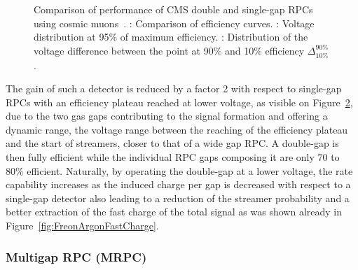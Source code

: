 \begin{figure}[H]
\begin{subfigure}{0.5\linewidth}
			\caption{\label{fig:DoubleGap:C}}
		\end{subfigure}
		\caption{\label{fig:DoubleGap} Comparison of performance of CMS double and single-gap RPCs using cosmic muons~\cite{ABBRESCIA2005}. : Comparison of efficiency curves. : Voltage distribution at 95\% of maximum efficiency. : Distribution of the voltage difference between the point at 90\% and 10\% efficiency $\Delta^{90\%}_{10\%}$.}
	\end{figure}
	
	The gain of such a detector is reduced by a factor 2 with respect to single-gap RPCs with an efficiency plateau reached at lower voltage, as visible on Figure~\ref{fig:DoubleGap}, due to the two gas gaps contributing to the signal formation and offering a dynamic range, the voltage range between the reaching of the efficiency plateau and the start of streamers, closer to that of a wide gap RPC. A double-gap is then fully efficient while the individual RPC gaps composing it are only 70 to 80\% efficient. Naturally, by operating the double-gap at a lower voltage, the rate capability increases as the induced charge per gap is decreased with respect to a single-gap detector also leading to a reduction of the streamer probability and a better extraction of the fast charge of the total signal as was shown already in Figure~\ref{fig:FreonArgonFastCharge}.
	
\newpage
	
		\subsubsection{Multigap RPC (MRPC)}
		\label{chapt3:sssec:MRPC}
	
\begingroup\setlength{\intextsep}{0pt}\setlength{\columnsep}{15pt}
	
